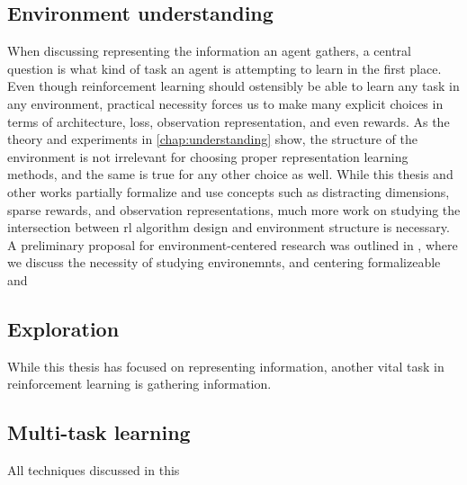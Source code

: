 \subsection{Environment understanding}

When discussing representing the information an agent gathers, a central question is what kind of task an agent is attempting to learn in the first place.
Even though reinforcement learning should ostensibly be able to learn any task in any environment, practical necessity forces us to make many explicit choices in terms of architecture, loss, observation representation, and even rewards.
As the theory and experiments in \autoref{chap:understanding} show, the structure of the environment is not irrelevant for choosing proper representation learning methods, and the same is true for any other choice as well.
While this thesis and other works partially formalize and use concepts such as distracting dimensions, sparse rewards, and observation representations, much more work on studying the intersection between \ac{rl} algorithm design and environment structure is necessary.
A preliminary proposal for environment-centered research was outlined in \textcite{voelcker2024can}, where we discuss the necessity of studying environemnts, and centering formalizeable and 

\subsection{Exploration}

While this thesis has focused on representing information, another vital task in reinforcement learning is gathering information.


\subsection{Multi-task learning}

All techniques discussed in this 
